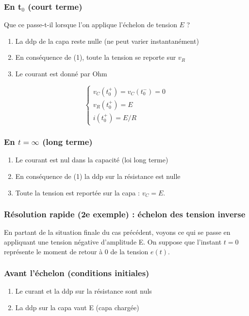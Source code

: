 \documentclass	[11pt, a4paper, openany]{book}
\begin{document}
\subsubsection{En t$_0$ (court terme)}
Que ce passe-t-il lorsque l'on applique l'échelon de tension $E$ ?
\begin{enumerate}
\item La ddp de la capa reste nulle (ne peut varier instantanément)
\item En conséquence de (1), toute la tension se reporte sur $v_R$
\item Le courant est donné par Ohm
\end{enumerate}
\begin{equation}
\left\{\begin{array}{l}
v_C(t_0^+) = v_C(t_0^-) = 0\\
v_R(t_0^+) = E\\
i(t_0^+) = E/R
\end{array}\right.
\end{equation}

\subsubsection{En $t = \infty$ (long terme)}
\begin{enumerate}
\item Le courant est nul dans la capacité (loi long terme)
\item En conséquence de (1) la ddp sur la résistance est nulle
\item Toute la tension est reportée sur la capa : $v_C = E$.
\end{enumerate}

\subsubsection{Résolution rapide (2e exemple) : échelon des tension inverse}
En partant de la situation finale du cas précédent, voyons ce qui se passe en appliquant une tension négative d'amplitude E. On suppose que l'instant $t=0$ représente le moment de retour à 0 de la tension $e(t)$.

\subsubsection{Avant l'échelon (conditions initiales)}
\begin{enumerate}
\item Le curant et la ddp sur la résistance sont nuls
\item La ddp sur la capa vaut E (capa chargée)
\end{enumerate}
\end{document}

